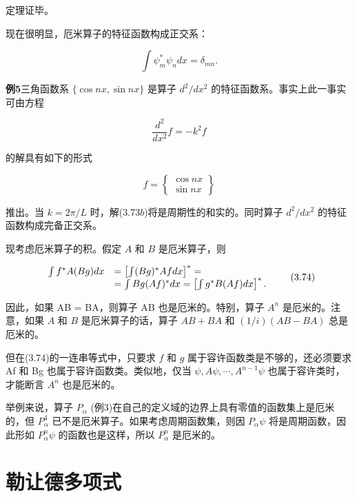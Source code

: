 定理证毕。

现在很明显，厄米算子的特征函数构成正交系：

\begin{equation*}
\int \psi_ {m} ^ {*} \psi_ {n} d x = \delta_ {m n}.\tag{3.72}
\end{equation*}

\textbf{例5}\quad 三角函数系 $\{\cos nx, \sin nx\}$ 是算子 $d^2 / dx^2$ 的特征函数系。事实上此一事实可由方程

\begin{equation*}
\frac {d ^ {2}}{d x ^ {2}} f = - k ^ {2} f\tag{3.73a}
\end{equation*}

的解具有如下的形式

\begin{equation*}
f = \left\{ \begin{array}{l} \cos n x \\ \sin n x \end{array} \right\}\tag{3.73b}
\end{equation*}

推出。当 $k = 2\pi / L$ 时，解(3.73$b$)将是周期性的和实的。同时算子 $d^2 / dx^2$ 的特征函数构成完备正交系。

现考虑厄米算子的积。假定 $A$ 和 $B$ 是厄米算子，则

\begin{equation*}
\begin{array}{r l} \int f ^ {*} A (B g) d x & = \left[ \int (B g) ^ {*} A f d x \right] ^ {*} = \\ & = \int B g (A f) ^ {*} d x = \left[ \int g ^ {*} B (A f) d x \right] ^ {*}. \end{array}\tag{3.74}
\end{equation*}

因此，如果 AB = BA，则算子 AB 也是厄米的。特别，算子 $A^n$ 是厄米的。注意，如果 $A$ 和 $B$ 是厄米算子的话，算子 $AB + BA$ 和 $(1 / i)(AB - BA)$ 总是厄米的。

但在(3.74)的一连串等式中，只要求 $f$ 和 $g$ 属于容许函数类是不够的，还必须要求 Af 和 Bg 也属于容许函数类。类似地，仅当 $\psi, A\psi, \cdots, A^{n-1}\psi$ 也属于容许类时，才能断言 $A^{n}$ 也是厄米的。

举例来说，算子 $P_{\alpha}$ (例3)在自己的定义域的边界上具有零值的函数集上是厄米的，但 $P_{\alpha}^{4}$ 已不是厄米算子。如果考虑周期函数集，则因 $P_{\alpha}\psi$ 将是周期函数，因此形如 $P_{\alpha}^{n}\psi$ 的函数也是这样，所以 $P_{\alpha}^{n}$ 是厄米的。

\section{勒让德多项式}

